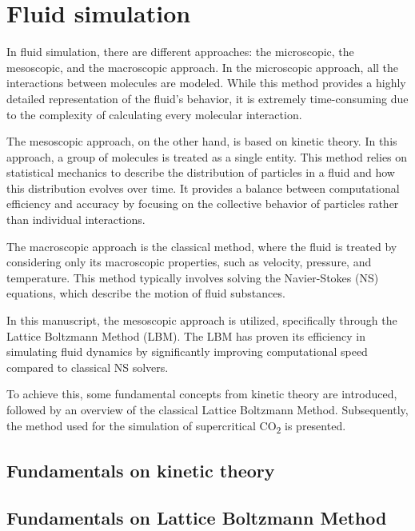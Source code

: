 \chapter{Fluid simulation}
\chaptertoc{}

In fluid simulation, there are different approaches: the microscopic, 
the mesoscopic, and the macroscopic approach. In the microscopic approach, 
all the interactions between molecules are modeled. While this method provides a 
highly detailed representation of the fluid's behavior, it is extremely 
time-consuming due to the complexity of calculating every molecular interaction.

The mesoscopic approach, on the other hand, is based on kinetic theory. In this 
approach, a group of molecules is treated as a single entity. This method relies 
on statistical mechanics to describe the distribution of particles in a fluid and
how this distribution evolves over time. It provides a balance between 
computational efficiency and accuracy by focusing on the collective behavior of 
particles rather than individual interactions.

The macroscopic approach is the classical method, where the fluid is treated by
considering only its macroscopic properties, such as velocity, pressure, and 
temperature. This method typically involves solving the Navier-Stokes (NS) 
equations, which describe the motion of fluid substances.

In this manuscript, the mesoscopic approach is utilized, specifically through
 the Lattice Boltzmann Method (LBM). The LBM has proven its efficiency in 
 simulating fluid dynamics by significantly improving computational speed compared 
 to classical NS solvers.

To achieve this, some fundamental concepts from kinetic theory are introduced,
followed by an overview of the classical Lattice Boltzmann Method. 
Subsequently, the method used for the simulation of supercritical 
CO\textsubscript{2} is presented.

\section{Fundamentals on kinetic theory}

\section{Fundamentals on Lattice Boltzmann Method}

